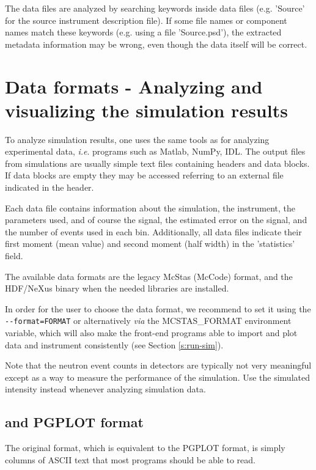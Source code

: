 The data files are analyzed by searching keywords inside data files
(e.g. 'Source' for the source instrument description file). If some file names or
component names match these keywords (e.g. using a file 'Source.psd'), the
extracted metadata information may be wrong, even though the data itself will be
correct.

\section{Data formats - Analyzing and visualizing the simulation results}
\label{s:analyze}

To analyze simulation results, one uses the same tools as for analyzing
experimental data, \textit{i.e}. programs such as Matlab, NumPy, IDL.  The
output files from simulations are usually simple text files containing headers
and data blocks. If data blocks are empty they may be accessed referring to an
external file indicated in the header.

Each data file contains information about the simulation, the instrument, the
parameters used, and of course the signal, the estimated error on the signal,
and the number of events used in each bin. Additionally, all data files indicate
their first moment (mean value) and second moment (half width) in the
'statistics' field.

The available data formats are the legacy McStas (McCode) format, and the HDF/NeXus binary when the needed libraries are installed.

In order for the user to choose the data format, we recommend to set it using
the \verb+--format=FORMAT+ or alternatively \textit{via} the MCSTAS\_FORMAT
environment variable, which will also make the front-end programs able to import
and plot data and instrument consistently (see Section \ref{s:run-sim}). 

Note that the neutron event counts in detectors are typically not very
meaningful except as a way to measure the performance of the
simulation. Use the simulated intensity instead whenever analyzing
simulation data.

\subsection{\MCS and PGPLOT format}
The \MCS original format, which is
equivalent to the PGPLOT format, is simply columns of ASCII text that most
programs should be able to read.

